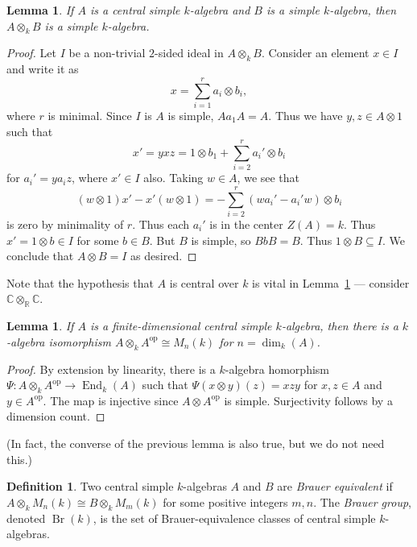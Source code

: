 \documentclass[12pt]{article}
\theoremstyle{plain}
\newtheorem{lemma}[theorem]{Lemma}
\theoremstyle{definition}
\newtheorem{definition}[theorem]{Definition}
\theoremstyle{remark}
\numberwithin{equation}{section}
\begin{document}
\begin{lemma} \label{lem:csa_simple_simple}
If $A$ is a central simple $k$-algebra and
$B$ is a simple $k$-algebra, then $A \otimes_k B$ is a simple
$k$-algebra.
\end{lemma}

\begin{proof}
Let $I$ be a non-trivial $2$-sided ideal in $A \otimes_k B$.
Consider an element $x \in I$ and write it as
\[
x = \sum_{i=1}^r a_i \otimes b_i,
\]
where $r$ is minimal.
Since $I$ is $A$ is simple, $Aa_1A=A$.  Thus we have $y,z \in A \otimes 1$
such that
\[
x'=yxz = 1 \otimes b_1 + \sum_{i=2}^r a_i' \otimes b_i
\]
for $a_i'=ya_iz$, where $x' \in I$ also.
Taking $w \in A$, we see that
\[
(w \otimes 1)x' - x'(w \otimes 1) = -\sum_{i=2}^r (wa_i'-a_i'w) \otimes
b_i
\]
is zero by minimality of $r$.  Thus each $a_i'$ is in the center
$Z(A)=k$.  Thus $x'=1 \otimes b \in I$ for some $b \in B$.
But $B$ is simple, so $BbB=B$.  Thus $1 \otimes B \subseteq I$.
We conclude that $A \otimes B = I$ as desired.
\end{proof}

Note that the hypothesis that $A$ is central over $k$ is vital
in Lemma~\ref{lem:csa_simple_simple} --- consider $\mathbb{C}
\otimes_{\mathbb{R}} \mathbb{C}$.

\begin{lemma}
If $A$ is a finite-dimensional central simple $k$-algebra,
then there is a $k$-algebra isomorphism
$A \otimes_k A^{\mathrm{op}} \cong M_n(k)$
for $n = \dim_k(A)$.
\end{lemma}

\begin{proof}
By extension by linearity, there is a $k$-algebra homorphism
$\Psi : A \otimes_k A^{\mathrm{op}} \to \operatorname{End}_k(A)$
such that $\Psi(x \otimes y)(z)=xzy$ for $x,z \in A$ and
$y \in A^{\mathrm{op}}$.  The map is injective since
$A \otimes A^{\mathrm{op}}$ is simple.
Surjectivity follows by a dimension count.
\end{proof}

(In fact, the converse of the previous lemma is also true, but we do not
need this.)

\begin{definition}
Two central simple $k$-algebras $A$ and $B$ are
\emph{Brauer equivalent} if $A \otimes_k M_n(k) \cong B \otimes_k
M_m(k)$ for some positive integers $m,n$.
The \emph{Brauer group}, denoted $\operatorname{Br}(k)$,
is the set of Brauer-equivalence classes
of central simple $k$-algebras.
\end{definition}
\end{document}
